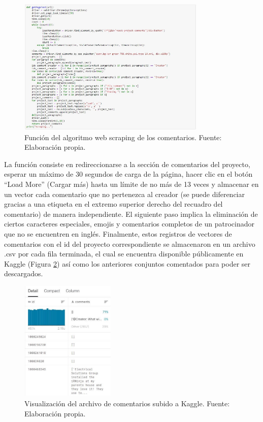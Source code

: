 \begin{figure}[!ht]
	\begin{center}
		\includegraphics[width=0.8\textwidth]{4/figures/comments_scraping.jpg}
		\caption{Función del algoritmo web scraping de los comentarios. Fuente: Elaboración propia.}
		\label{4:fig8}
	\end{center}
\end{figure}

La función consiste en redireccionarse a la sección de comentarios del proyecto, esperar un máximo de 30 segundos de carga de la página, hacer clic en el botón “Load More” (Cargar más) hasta un límite de no más de 13 veces y almacenar en un vector cada comentario que no pertenezca al creador (se puede diferenciar gracias a una etiqueta en el extremo superior derecho del recuadro del comentario) de manera independiente. El siguiente paso implica la eliminación de ciertos caracteres especiales, emojis y comentarios completos de un patrocinador que no se encuentren en inglés. Finalmente, estos registros de vectores de comentarios con el id del proyecto correspondiente se almacenaron en un archivo .csv por cada fila terminada, el cual se encuentra disponible públicamente en Kaggle (Figura \ref{4:fig9}) así como los anteriores conjuntos comentados para poder ser descargados.

\begin{figure}[!ht]
	\begin{center}
		\includegraphics[width=0.4\textwidth]{4/figures/comments_kaggle_preview.jpg}
		\caption{Visualización del archivo de comentarios subido a Kaggle. Fuente: Elaboración propia.}
		\label{4:fig9}
	\end{center}
\end{figure}

